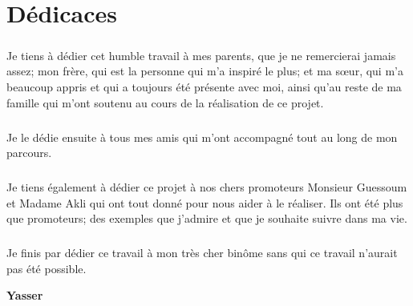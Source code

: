 \chapter*{Dédicaces}    

\vspace{1.5cm}

\paragraph{}
Je tiens à dédier cet humble travail à mes parents, que je ne remercierai jamais assez; mon frère, qui est la personne qui m'a inspiré le plus; et ma s\oe{}ur, qui m'a beaucoup appris et qui a toujours été présente avec moi, ainsi qu'au reste de ma famille qui m'ont soutenu au cours de la réalisation de ce projet. 
\paragraph{}
Je le dédie ensuite à tous mes amis qui m'ont accompagné tout au long de mon parcours. 
\paragraph{}
Je tiens également à dédier ce projet à nos chers promoteurs Monsieur Guessoum et Madame Akli qui ont tout donné pour nous aider à le réaliser. Ils ont été plus que promoteurs; des exemples que j'admire et que je souhaite suivre dans ma vie.
\paragraph{}
Je finis par dédier ce travail à mon très cher binôme sans qui ce travail n'aurait pas été possible.

\vspace{0.5cm}
\begin{center}
	\Large
	\hspace{12.5cm}
	\textbf{Yasser}
\end{center}